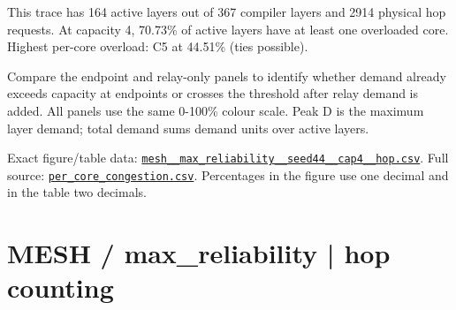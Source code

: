 \documentclass[10pt,a4paper]{article}
\begin{document}
This trace has 164 active layers out of 367 compiler layers and 2914 physical hop requests. At capacity 4, 70.73\% of active layers have at least one overloaded core. Highest per-core overload: C5 at 44.51\% (ties possible).\par
Compare the endpoint and relay-only panels to identify whether demand already exceeds capacity at endpoints or crosses the threshold after relay demand is added. All panels use the same 0-100\% colour scale. Peak D is the maximum layer demand; total demand sums demand units over active layers.\par
Exact figure/table data: \href{\detokenize{file:///home/dhruv-pansuriya/Documents/BTP/Compiler-Driven-ACE/output/pdf/qaoa_methods_congestion/tables/mesh__max_reliability__seed44__cap4__hop.csv}}{\nolinkurl{mesh__max_reliability__seed44__cap4__hop.csv}}. Full source: \href{\detokenize{file:///home/dhruv-pansuriya/Documents/BTP/Compiler-Driven-ACE/results/qaoa_2seed_2026-10-26/congestion/per_core_congestion.csv}}{\nolinkurl{per_core_congestion.csv}}. Percentages in the figure use one decimal and in the table two decimals.\par
\clearpage
\section*{MESH / max\_reliability | hop counting}
\end{document}
